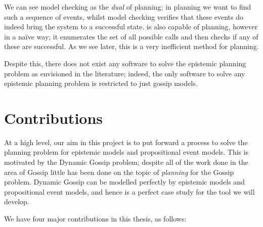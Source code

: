 \documentclass[10pt, a4paper]{report}
\begin{document}
We can see model checking as the \emph{dual} of planning; in planning we want
to find such a sequence of events, whilst model checking verifies that these
events do indeed bring the system to a successful state. \cite{GithubGossip} is
also capable of planning, however in a na{\"i}ve way; it enumerates the set of
all possible calls and then checks if any of these are successful. As we see
later, this is a very inefficient method for planning.  

Despite this, there does not exist any software to solve the epistemic planning
problem as envisioned in the literature; indeed, the only software to solve any
epistemic planning problem is restricted to just gossip models.

\section{Contributions}

At a high level, our aim in this project is to put forward a process to solve
the planning problem for epistemic models and propositional event models. This
is motivated by the Dynamic Gossip problem; despite all of the work done in the
area of Gossip little has been done on the topic of \emph{planning} for the
Gossip problem. Dynamic Gossip can be modelled perfectly by epistemic models and
propositional event models, and hence is a perfect case study for the tool we
will develop. 

We have four major contributions in this thesis, as follows:
\end{document}

